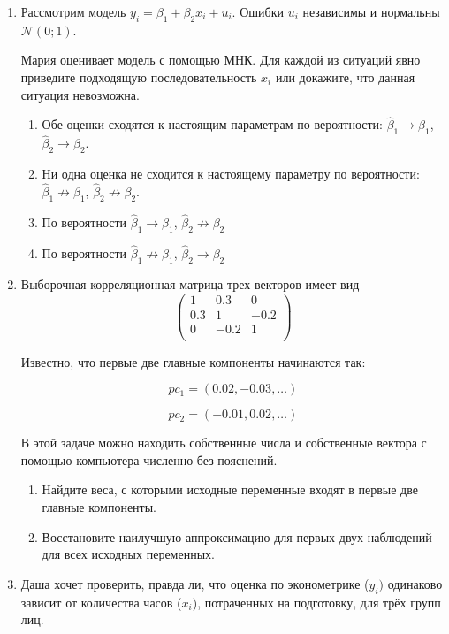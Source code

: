 \documentclass[12pt]{article} %
\theoremstyle{definition} %
\def \hb{\hat{\beta}}
\def \cN{\mathcal{N}}
\begin{document}
\begin{enumerate}
\item Рассмотрим модель $y_i = \beta_1 + \beta_2 x_i + u_i$. 
Ошибки $u_i$ независимы и нормальны $\cN(0;1)$.

Мария оценивает модель с помощью МНК. 
Для каждой из ситуаций явно приведите подходящую последовательность $x_i$ 
или докажите, что данная ситуация невозможна.

\begin{enumerate}
    \item Обе оценки сходятся к настоящим параметрам по вероятности: $\hb_1 \to \beta_1$, $\hb_2 \to \beta_2$.
\item Ни одна оценка не сходится к настоящему параметру по вероятности: $\hb_1 \not\to \beta_1$, $\hb_2 \not\to \beta_2$.
\item По вероятности $\hb_1 \to \beta_1$, $\hb_2 \not\to \beta_2$
\item По вероятности $\hb_1 \not\to \beta_1$, $\hb_2 \to \beta_2$
\end{enumerate}


\newpage
\item Выборочная корреляционная матрица трех векторов имеет вид 
\[
\begin{pmatrix}
1 & 0.3 & 0 \\
0.3 & 1 & -0.2 \\
0 & -0.2 & 1 \\
\end{pmatrix}    
\]


Известно, что первые две главные компоненты начинаются так:

\[
pc_1 = (0.02, -0.03, \ldots)    
\]

\[
pc_2 = (-0.01, 0.02, \ldots)    
\]



В этой задаче можно находить собственные числа и собственные вектора с помощью компьютера численно без пояснений.



\begin{enumerate}
    \item Найдите веса, с которыми исходные переменные входят в первые две главные компоненты. 


    \item Восстановите наилучшую аппроксимацию для первых двух наблюдений для всех исходных переменных.

\end{enumerate}


\item Даша хочет проверить, правда ли, что оценка по эконометрике ($y_i)$ одинаково зависит от количества 
часов ($x_i$), потраченных на подготовку, для трёх групп лиц. 


\end{enumerate}
\end{document}
